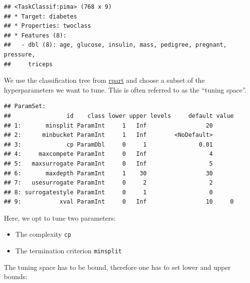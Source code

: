 \documentclass[]{scrbook}
\newenvironment{Shaded}{\begin{snugshade}}{\end{snugshade}}
\newcommand{\DataTypeTok}[1]{\textcolor[rgb]{0.13,0.29,0.53}{#1}}
\newcommand{\DecValTok}[1]{\textcolor[rgb]{0.00,0.00,0.81}{#1}}
\newcommand{\FloatTok}[1]{\textcolor[rgb]{0.00,0.00,0.81}{#1}}
\newcommand{\KeywordTok}[1]{\textcolor[rgb]{0.13,0.29,0.53}{\textbf{#1}}}
\newcommand{\NormalTok}[1]{#1}
\newcommand{\OperatorTok}[1]{\textcolor[rgb]{0.81,0.36,0.00}{\textbf{#1}}}
\newcommand{\StringTok}[1]{\textcolor[rgb]{0.31,0.60,0.02}{#1}}
\providecommand{\tightlist}{%
  \setlength{\itemsep}{0pt}\setlength{\parskip}{0pt}}
\renewenvironment{Shaded} {\begin{snugshade}\small} {\end{snugshade}}
\begin{document}
\begin{verbatim}
## <TaskClassif:pima> (768 x 9)
## * Target: diabetes
## * Properties: twoclass
## * Features (8):
##   - dbl (8): age, glucose, insulin, mass, pedigree, pregnant, pressure,
##     triceps
\end{verbatim}

We use the classification tree from \href{https://cran.r-project.org/package=rpart}{rpart} and choose a subset of the hyperparameters we want to tune.
This is often referred to as the ``tuning space''.

\begin{Shaded}
\end{Shaded}

\begin{verbatim}
## ParamSet: 
##                id    class lower upper levels     default value
## 1:       minsplit ParamInt     1   Inf                 20      
## 2:      minbucket ParamInt     1   Inf        <NoDefault>      
## 3:             cp ParamDbl     0     1               0.01      
## 4:     maxcompete ParamInt     0   Inf                  4      
## 5:   maxsurrogate ParamInt     0   Inf                  5      
## 6:       maxdepth ParamInt     1    30                 30      
## 7:   usesurrogate ParamInt     0     2                  2      
## 8: surrogatestyle ParamInt     0     1                  0      
## 9:           xval ParamInt     0   Inf                 10     0
\end{verbatim}

Here, we opt to tune two parameters:

\begin{itemize}
\tightlist
\item
  The complexity \texttt{cp}
\item
  The termination criterion \texttt{minsplit}
\end{itemize}

The tuning space has to be bound, therefore one has to set lower and upper bounds:

\begin{Shaded}
\end{Shaded}
\end{document}

